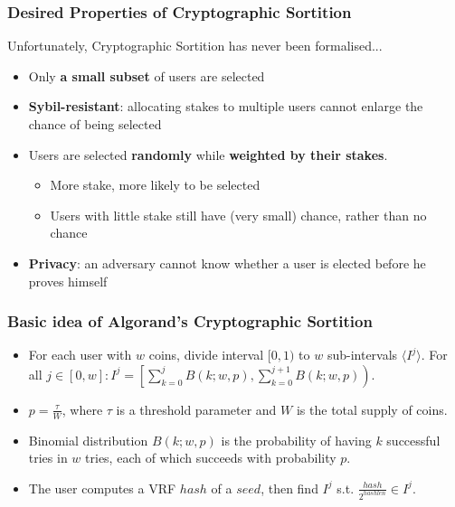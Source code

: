 \documentclass{beamer}
\begin{document}
\begin{frame}
\frametitle{Desired Properties of Cryptographic Sortition}

Unfortunately, Cryptographic Sortition has never been formalised...

\begin{itemize}
    \item Only \textbf{a small subset} of users are selected
    \item \textbf{Sybil-resistant}: allocating stakes to multiple users cannot enlarge the chance of being selected
    \item Users are selected \textbf{randomly} while \textbf{weighted by their stakes}.
    \begin{itemize}
        \item More stake, more likely to be selected
        \item Users with little stake still have (very small) chance, rather than no chance
    \end{itemize}
    \item \textbf{Privacy}: an adversary cannot know whether a user is elected before he proves himself
\end{itemize}
    
\end{frame}

\begin{frame}
\frametitle{Basic idea of Algorand's Cryptographic Sortition}

\begin{itemize}
    \item For each user with $w$ coins, divide interval $[0, 1)$ to $w$ sub-intervals $\langle I^j \rangle$. For all $j \in [0, w]: I^j = \left[ \sum_{k=0}^j B(k;w,p), \sum_{k=0}^{j+1} B(k;w,p) \right)$.
    \item $p = \frac{\tau}{W}$, where $\tau$ is a threshold parameter and $W$ is the total supply of coins.
    \item Binomial distribution $B(k;w,p)$ is the probability of having $k$ successful tries in $w$ tries, each of which succeeds with probability $p$.
    \item The user computes a VRF $hash$ of a $seed$, then find $I^j$ s.t. $\frac{hash}{2^{hashlen}} \in I^j$.
\end{itemize}
    
\end{frame}
\end{document}
